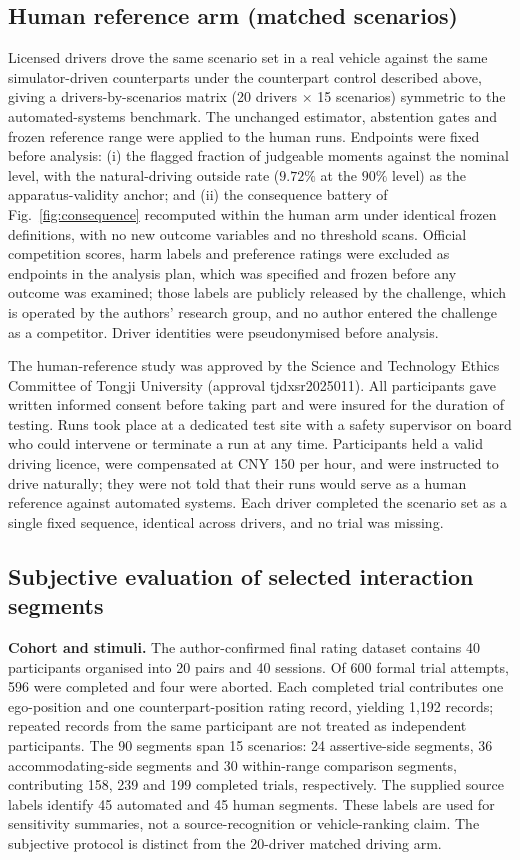 \documentclass[12pt,a4paper]{article}
\begin{document}
\subsection{Human reference arm (matched scenarios)}
Licensed drivers drove the same scenario set in a real vehicle against the same simulator-driven
counterparts under the counterpart control described above,
giving a drivers-by-scenarios matrix (20 drivers $\times$
15 scenarios) symmetric to the automated-systems benchmark. The unchanged estimator,
abstention gates and frozen reference range were applied to the human runs. Endpoints were fixed
before analysis: (i) the flagged fraction of judgeable moments against the nominal level, with the
natural-driving outside rate ($9.72\%$ at the $90\%$ level) as the apparatus-validity anchor; and
(ii) the consequence battery of Fig.~\ref{fig:consequence} recomputed within the human arm under
identical frozen definitions, with no new outcome variables and no threshold scans. Official
competition scores, harm labels and preference ratings were excluded as endpoints in the analysis
plan, which was specified and frozen before any outcome was examined; those labels are publicly
released by the challenge, which is operated by the authors' research group, and no author entered
the challenge as a competitor. Driver identities were pseudonymised before analysis.

The human-reference study was approved by the Science and Technology Ethics Committee of Tongji
University (approval tjdxsr2025011). All participants gave written informed consent before taking
part and were insured for the duration of testing. Runs took place at a dedicated test site with a
safety supervisor on board who could intervene or terminate a run at any time. Participants held a
valid driving licence, were compensated at CNY 150 per hour, and were instructed to drive naturally;
they were not told that their runs would serve as a human reference against automated systems. Each
driver completed the scenario set as a single fixed sequence, identical across drivers, and no trial
was missing.

\subsection{Subjective evaluation of selected interaction segments}
\label{sec:subjective_methods}
\noindent\textbf{Cohort and stimuli.} The author-confirmed final rating dataset contains 40
participants organised into 20 pairs and 40 sessions. Of 600 formal trial attempts, 596 were completed
and four were aborted. Each completed trial contributes one ego-position and one counterpart-position
rating record, yielding 1{,}192 records; repeated records from the same participant are not treated
as independent participants. The 90 segments span 15 scenarios: 24 assertive-side segments,
36 accommodating-side segments and 30 within-range comparison segments, contributing 158, 239 and
199 completed trials, respectively. The supplied source labels identify 45 automated and 45 human
segments. These labels are used for sensitivity summaries, not a source-recognition or vehicle-ranking
claim. The subjective protocol is distinct from the 20-driver matched driving arm.
\end{document}
